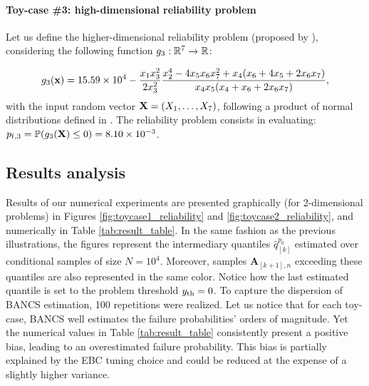 \paragraph{Toy-case \#3: high-dimensional reliability problem}

Let us define the higher-dimensional reliability problem (proposed by \cite{yun2018efficient}), considering the following function $g_3 : \mathbb{R}^7 \rightarrow \mathbb{R}$:

\begin{equation}
    g_3({\bf x}) = 15.59 \times 10^4 - \frac{x_1 x_3^2}{2 x_3^2} \frac{x_2^4 - 4 x_5 x_6 x_7^2 + x_4 (x_6 + 4 x_5 + 2 x_6 x_7)}{x_4 x_5 (x_4 + x_6 + 2 x_6 x_7)},
\end{equation}
with the input random vector ${\bf X} = (X_1, \dots, X_7)$, following a product of normal distributions defined in \cite{yun2018efficient}. 
The reliability problem consists in evaluating: $p_{\mathrm{f}, 3} = \mathbb{P} ( g_3({\bf X}) \leq 0 ) =  8.10 \times 10^{-3}$.


\subsection{Results analysis}

Results of our numerical experiments are presented graphically (for 2-dimensional problems) in Figures  \ref{fig:toycase1_reliability} and \ref{fig:toycase2_reliability}, and numerically in Table \ref{tab:result_table}. 
In the same fashion as the previous illustrations, the figures represent the intermediary quantiles $\widehat{q}_{[k]}^{p_0}$ estimated over conditional samples of size $N=10^4$. 
Moreover, samples $\mathbf{A}_{[k+1], n}$ exceeding these quantiles are also represented in the same color. 
Notice how the last estimated quantile is set to the problem threshold $y_\mathrm{th} = 0$. 
To capture the dispersion of BANCS estimation, 100 repetitions were realized. 
Let us notice that for each toy-case, BANCS well estimates the failure probabilities' orders of magnitude. 
Yet the numerical values in Table \ref{tab:result_table} consistently present a positive bias, leading to an overestimated failure probability. 
This bias is partially explained by the EBC tuning choice and could be reduced at the expense of a slightly higher variance.

